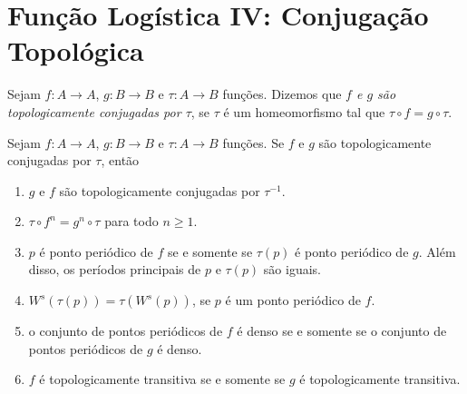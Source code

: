 \section{Função Logística IV: Conjugação Topológica}


\begin{definition}
Sejam $f: A \to A$, $g: B \to B$ e $\tau: A \to B$ funções. Dizemos que \textit{$f$ e $g$ são topologicamente conjugadas por $\tau$}, se $\tau$ é um homeomorfismo tal que $\tau \circ f = g \circ \tau$.
\end{definition}


\begin{proposition}
\label{proposicao conjugacaotopologica 1}
Sejam $f: A \to A$, $g: B \to B$ e $\tau: A \to B$ funções. Se $f$ e $g$ são topologicamente conjugadas por $\tau$, então
\begin{enumerate}
\item $g$ e $f$ são topologicamente conjugadas por $\tau^{-1}$.
\item $\tau \circ f^n = g^n \circ \tau$ para todo $n \geq 1$.
\item $p$ é ponto periódico de $f$ se e somente se $\tau(p)$ é ponto periódico de $g$. Além disso, os períodos principais de $p$ e $\tau(p)$ são iguais.
\item $W^s(\tau(p)) = \tau(W^s(p))$, se $p$ é um ponto periódico de $f$.
\item o conjunto de pontos periódicos de $f$ é denso se e somente se o conjunto de pontos periódicos de $g$ é denso.
\item $f$ é topologicamente transitiva se e somente se $g$ é topologicamente transitiva.
\end{enumerate}
\end{proposition}

